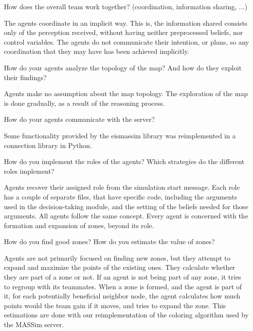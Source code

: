 \begin{question}
How does the overall team work together? (coordination, information sharing,
...) 
\end{question}

The agents coordinate in an implicit way. This is, the  information shared
consists only of the perception received, without having neither preprocessed
beliefs, nor control variables. The agents do not communicate their intention,
or plans, so any coordination that they may have has been achieved implicitly.

\begin{question}
How do your agents analyze the topology of the map? And how do they exploit
their findings? 
\end{question}

Agents make no assumption about the map topology. The exploration of the map is
done gradually, as a result of the reasoning process.

\begin{question}
How do your agents communicate with the server?  
\end{question}

Some functionality provided by the eismassim library was reimplemented in
a connection library in Python.

\begin{question}
How do you implement the roles of the agents? Which strategies do the different
roles implement?  
\end{question}

Agents recover their assigned role from the simulation start message.  Each role
has a couple of separate files, that have specific code, including the arguments
used in the decision-taking module, and the setting of the beliefs needed for
those arguments.  All agents follow the same concept. Every agent is concerned
with the formation and expansion of zones, beyond its role.

\begin{question}
How do you find good zones? How do you estimate the value of zones?  
\end{question}

Agents are not primarily focused on finding new zones, but they attempt to
expand and maximize the points of the existing ones. They calculate whether they
are part of a zone or not.  If an agent is not being part of any zone, it tries
to regroup with its teammates. When a zone is formed, and the agent is part of
it, for each potentially beneficial neighbor node, the agent calculates how much
points would the team gain if it moves, and tries to expand the zone.  This
estimations are done with our reimplementation of the coloring algorithm used by
the MASSim server.

